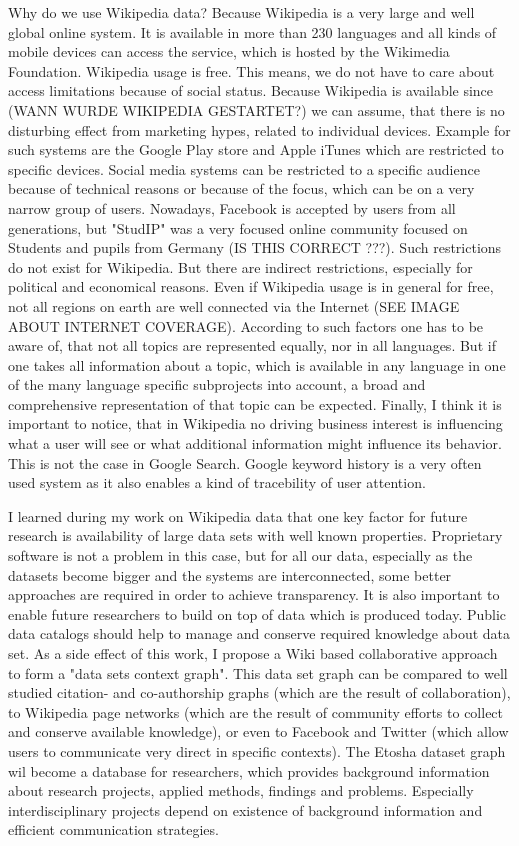 \documentclass[a4paper,10pt]{scrbook}
\begin{document}
Why do we use Wikipedia data? Because Wikipedia is a very large and well global online system. It is available in more than 230 languages and all kinds of mobile devices can access the service, which is hosted by the Wikimedia Foundation. Wikipedia usage is free. This means, we do not have to care about access limitations because of social status. Because Wikipedia is available since  (WANN WURDE WIKIPEDIA GESTARTET?) we can assume, that there is no disturbing effect from marketing hypes, related to individual devices. Example for such systems are the Google Play store and Apple iTunes which are restricted to specific devices. Social media systems can be restricted to a specific audience because of technical reasons or because of the focus, which can be on a very narrow group of users. Nowadays, Facebook is accepted by users from all generations, but "StudIP" was a very focused online community focused on Students and pupils from Germany (IS THIS CORRECT ???). Such restrictions do not exist for Wikipedia. But there are indirect restrictions, especially for political and economical reasons. Even if Wikipedia usage is in general for free, not all regions on earth are well connected via the Internet (SEE IMAGE ABOUT INTERNET COVERAGE). According to such factors one has to be aware of, that not all topics are represented equally, nor in all languages. But if one takes all information about a topic, which is available in any language in one of the many language specific subprojects into account, a broad and comprehensive representation of that topic can be expected. Finally, I think it is important to notice, that in Wikipedia no driving business interest is influencing what a user will see or what additional information might influence its behavior. This is not the case in Google Search. Google keyword history is a very often used system as it also enables a kind of tracebility of user attention. 

I learned during my work on Wikipedia data that one key factor for future research is availability of large data sets with well known properties. Proprietary software is not a problem in this case, but for all our data, especially as the datasets become bigger and the systems are interconnected, some better approaches are required in order to achieve transparency. It is also important to enable future researchers to build on top of data which is produced today. Public data catalogs should help to manage and conserve required knowledge about data set. As a side effect of this work, I propose a Wiki based collaborative approach to form a "data sets context graph". This data set graph can be compared to well studied citation- and co-authorship graphs \cite{TBD} (which are the result of  collaboration), to Wikipedia page networks (which are the result of community efforts to collect and conserve available knowledge), or even to Facebook and Twitter (which allow users to communicate very direct in specific contexts). The Etosha dataset graph wil become a database for researchers, which provides background information about research projects, applied methods, findings and problems. Especially interdisciplinary projects depend on existence of background information and efficient communication strategies. 
\end{document}
